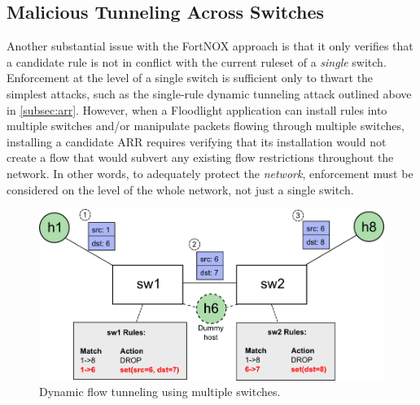 
\subsection{Malicious Tunneling Across Switches}
Another substantial issue with the FortNOX approach is that it only verifies that a candidate rule is not in conflict with the current ruleset of a \emph{single} switch. 
Enforcement at the level of a single switch is sufficient only to thwart the simplest attacks, such as the single-rule dynamic tunneling attack outlined above in \ref{subsec:arr}. 
However, when a Floodlight application can install rules into multiple switches and/or manipulate packets flowing through multiple switches, installing a candidate ARR requires verifying that its installation would not create a flow that would subvert any existing flow restrictions throughout the network. 
In other words, to adequately protect the \emph{network}, enforcement must be considered on the level of the whole network, not just a single switch.

\begin{figure}[ht!]
	\begin{center}
		\includegraphics[width=\columnwidth]{figs/multiSwitch_diagram.png}
		\caption{Dynamic flow tunneling using multiple switches.}
		\label{fig:dft_multi}
	\end{center}
\end{figure}

